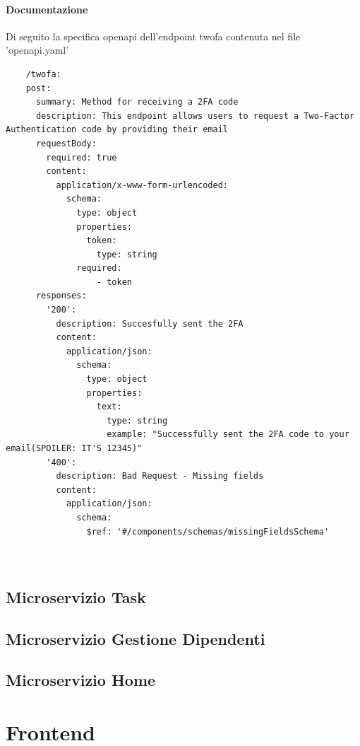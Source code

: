 \documentclass{report}
\begin{document}
\subsubsection*{Documentazione}
Di seguito la specifica openapi dell'endpoint twofa contenuta nel file 'openapi.yaml'
\begin{verbatim}
	/twofa:
    post:
      summary: Method for receiving a 2FA code 
      description: This endpoint allows users to request a Two-Factor Authentication code by providing their email
      requestBody:
        required: true
        content:
          application/x-www-form-urlencoded:
            schema:
              type: object
              properties:
                token:
                  type: string
              required:
                  - token
      responses:
        '200':
          description: Succesfully sent the 2FA
          content:
            application/json:
              schema:
                type: object
                properties:
                  text:
                    type: string
                    example: "Successfully sent the 2FA code to your email(SPOILER: IT'S 12345)"
        '400':
          description: Bad Request - Missing fields 
          content:
            application/json:
              schema:
                $ref: '#/components/schemas/missingFieldsSchema'
                     
     
\end{verbatim}
\section{Microservizio Task}

\section{Microservizio Gestione Dipendenti}

\section{Microservizio Home}

\chapter{Frontend}

	
\end{document}
